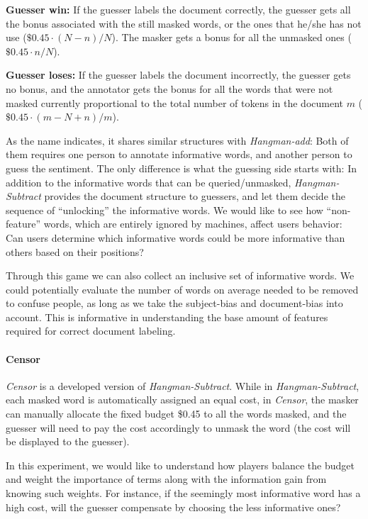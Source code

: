 \documentclass[chi_draft]{sigchi}
\begin{document}
\begin{compactitem}
	\item \textbf{Guesser win: } If the guesser labels the document correctly, the guesser gets all the bonus associated with the still masked words, or the ones that he/she has not use ($\$0.45\cdot (N-n) / N$). The masker gets a bonus for all the unmasked ones ($\$0.45\cdot n / N$). 
	\item \textbf{Guesser loses: } If the guesser labels the document incorrectly, the guesser gets no bonus, and the annotator gets the bonus for all the words that were not masked currently proportional to the total number of tokens in the document $m$ ($\$0.45\cdot (m-N+n) / m$).
\end{compactitem}

As the name indicates, it shares similar structures with \emph{Hangman-add}: 
Both of them requires one person to annotate informative words, and another person to  guess the sentiment. 
The only difference is what the guessing side starts with: 
In addition to the informative words that can be queried/unmasked, \emph{Hangman-Subtract} provides the document structure to guessers, and let them decide the sequence of ``unlocking'' the informative words. 
We would like to see how ``non-feature'' words, which are entirely ignored by machines, affect users behavior: Can users determine which informative words could be more informative than others based on their positions?

Through this game we can also collect an inclusive set of informative words. We could potentially evaluate the number of words on average needed to be removed to confuse people, as long as we take the subject-bias and document-bias into account. This is informative in understanding the base amount of features required for correct document labeling.

\paragraph{Censor}
\emph{Censor} is a developed version of \emph{Hangman-Subtract}. 
While in \emph{Hangman-Subtract}, each masked word is automatically assigned an equal cost, in \emph{Censor}, the masker can manually allocate the fixed budget \$0.45 to all the words masked, and the guesser will need to pay the cost accordingly to unmask the word (the cost will be displayed to the guesser). 

In this experiment, we would like to understand how players balance the budget and weight the importance of terms along with the information gain from knowing such weights. For instance, if the seemingly most informative word has a high cost, will the guesser compensate by choosing the less informative ones? 
\end{document}
